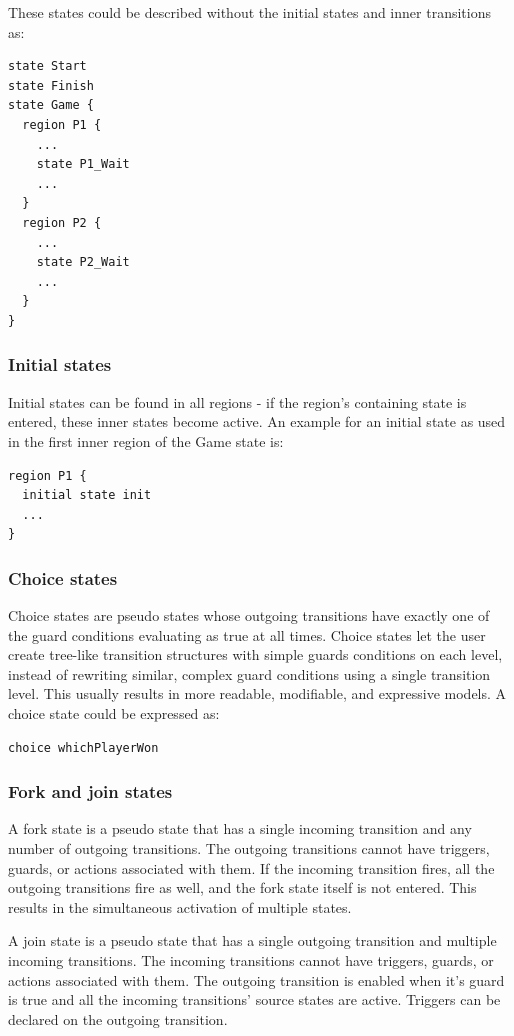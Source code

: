 These states could be described without the initial states and inner transitions as:

\begin{lstlisting}
state Start
state Finish
state Game {
  region P1 {
    ...
    state P1_Wait
    ...  
  }
  region P2 {
    ...
    state P2_Wait
    ...
  }
}
\end{lstlisting}

    \subsubsection{Initial states}
Initial states can be found in all regions - if the region's containing state is entered, these inner states become active. An example for an initial state as used in the first inner region of the Game state is:

\begin{lstlisting}
region P1 {
  initial state init
  ...  
}
\end{lstlisting}

    \subsubsection{Choice states}
Choice states are pseudo states whose outgoing transitions have exactly one of the guard conditions evaluating as true at all times. Choice states let the user create tree-like transition structures with simple guards conditions on each level, instead of rewriting similar, complex guard conditions using a single transition level. This usually results in more readable, modifiable, and expressive models. A choice state could be expressed as:

\begin{lstlisting}
choice whichPlayerWon
\end{lstlisting}

    \subsubsection{Fork and join states}
A fork state is a pseudo state that has a single incoming transition and any number of outgoing transitions. The outgoing transitions cannot have triggers, guards, or actions associated with them. If the incoming transition fires, all the outgoing transitions fire as well, and the fork state itself is not entered. This results in the simultaneous activation of multiple states.

A join state is a pseudo state that has a single outgoing transition and multiple incoming transitions. The incoming transitions cannot have triggers, guards, or actions associated with them. The outgoing transition is enabled when it's guard is true and all the incoming transitions' source states are active. Triggers can be declared on the outgoing transition.

